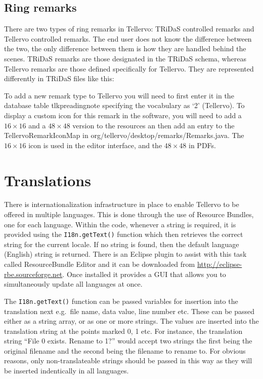 \subsection{Ring remarks}
There are two types of ring remarks in Tellervo: TRiDaS controlled remarks and Tellervo controlled remarks.  The end user does not know the difference between the two, the only difference between them is how they are handled behind the scenes.  TRiDaS remarks are those designated in the TRiDaS schema, whereas Tellervo remarks are those defined specifically for Tellervo.  They are represented differently in TRiDaS files like this: 

To add a new remark type to Tellervo you will need to first enter it in the database table tlkpreadingnote specifying the vocabulary as `2' (Tellervo).  To display a custom icon for this remark in the software, you will need to add a $16\times16$ and a $48\times48$ version to the resources an then add an entry to the TellervoRemarkIconMap in org/tellervo/desktop/remarks/Remarks.java.  The $16\times16$ icon is used in the editor interface, and the $48\times48$ in PDFs.

\section{Translations}
There is internationalization infrastructure in place to enable Tellervo to be offered in multiple languages.  This is done through the use of Resource Bundles, one for each language.  Within the code, whenever a string is required, it is provided using the \verb|I18n.getText()| function which then retrieves the correct string for the current locale.  If no string is found, then the default language (English) string is returned.  There is an Eclipse plugin to assist with this task called ResourceBundle Editor and it can be downloaded from \url{http://eclipse-rbe.sourceforge.net}.  Once installed it provides a GUI that allows you to simultaneously update all languages at once.

The \verb|I18n.getText()| function can be passed variables for insertion into the translation next e.g.\ file name, data value, line number etc.  These can be passed either as a string array, or as one or more strings.  The values are inserted into the translation string at the points marked {0}, {1} etc.  For instance, the translation string ``File {0} exists.  Rename to {1}?'' would accept two strings the first being the original filename and the second being the filename to rename to.  For obvious reasons, only non-translateable strings should be passed in this way as they will be inserted indentically in all languages.

